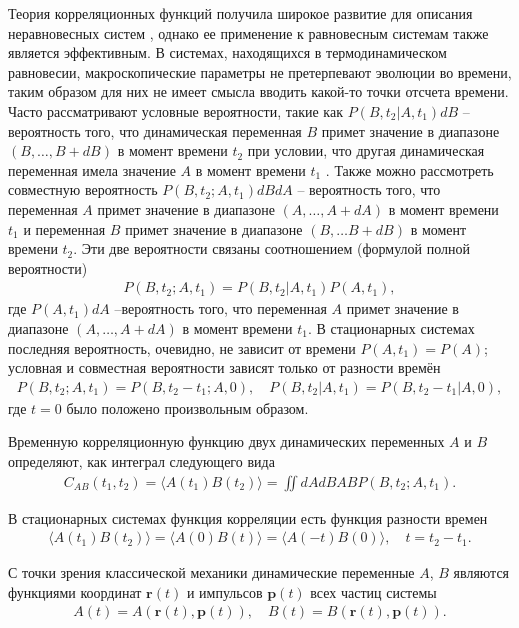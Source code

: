 \documentclass[12pt]{article}
\newcommand{\mf}{\mathbf}
\newcommand{\lb}{\left(}
\newcommand{\rb}{\right)}
\newcommand{\mean}[1]{\langle #1 \rangle}
\begin{document}
Теория корреляционных функций получила широкое развитие для описания неравновесных систем \cite{zwanzig1965}, однако ее применение к равновесным системам также является эффективным. В системах, находящихся в термодинамическом равновесии, макроскопические параметры не претерпевают эволюции во времени, таким образом для них не имеет смысла вводить какой-то точки отсчета времени. Часто рассматривают условные вероятности, такие как $P(B, t_2 \vert A, t_1) dB$ -- вероятность того, что динамическая переменная $B$ примет значение в диапазоне $(B, \dots, B + dB)$ в момент времени $t_2$ при условии, что другая динамическая переменная имела значение $A$ в момент времени $t_1$ \cite{nitzan2006}. Также можно рассмотреть совместную вероятность $P(B, t_2; A, t_1) dB dA$ -- вероятность того, что переменная $A$ примет значение в диапазоне $(A, \dots, A+dA)$ в момент времени $t_1$ и переменная $B$ примет значение в диапазоне $(B, \dots B+dB)$ в момент времени $t_2$. Эти две вероятности связаны соотношением (формулой полной вероятности)
\begin{gather}
    P(B, t_2; A, t_1) = P(B, t_2 \vert A, t_1) P(A, t_1), 
\end{gather}
где $P(A, t_1) dA$ --вероятность того, что переменная $A$ примет значение в диапазоне $(A, \dots, A+dA)$ в момент времени $t_1$. В стационарных системах последняя вероятность, очевидно, не зависит от времени $P(A, t_1) = P(A)$; условная и совместная вероятности зависят только от разности времён
\begin{gather}
    P(B, t_2; A, t_1) = P(B, t_2 - t_1; A, 0), \quad P(B, t_2 \vert A, t_1) = P(B, t_2 - t_1 \vert A, 0),
\end{gather}
%
где $t = 0$ было положено произвольным образом.\par
Временную корреляционную функцию двух динамических переменных $A$ и $B$ определяют, как интеграл следующего вида 
\begin{gather}
    C_{AB}(t_1, t_2) = \mean{ A(t_1) B(t_2) } = \iint dA dB AB P(B, t_2; A, t_1). \label{part1-correlation-function-definition}
\end{gather}

В стационарных системах функция корреляции есть функция разности времен
\begin{gather}
    \mean{ A(t_1) B(t_2) } = \mean{ A(0) B(t) } = \mean{ A(-t) B(0) }, \quad t = t_2 - t_1.
\end{gather}

С точки зрения классической механики динамические переменные $A$, $B$ являются функциями координат $\mf{r}(t)$ и импульсов $\mf{p}(t)$ всех частиц системы
\begin{gather}
    A(t) = A \lb \mf{r}(t), \mf{p}(t) \rb, \quad B(t) = B \lb \mf{r}(t), \mf{p}(t) \rb.
\end{gather}
\end{document}
